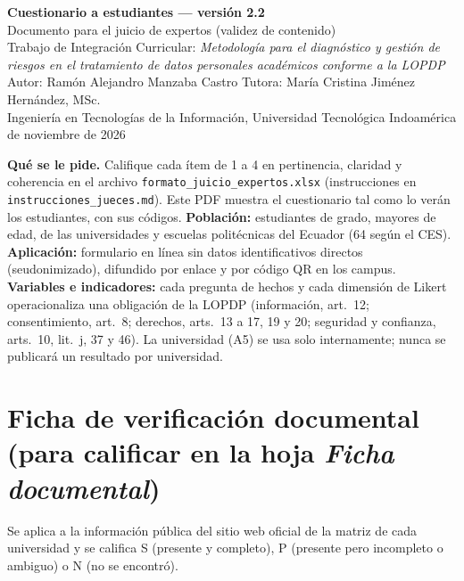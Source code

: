 \documentclass[11pt,a4paper]{article}
\begin{document}
\begin{center}
{\large\textbf{Cuestionario a estudiantes --- versión 2.2}}\\[2pt]
Documento para el juicio de expertos (validez de contenido)\\[2pt]
\small Trabajo de Integración Curricular: \textit{Metodología para el diagnóstico y gestión de riesgos en el tratamiento de datos personales académicos conforme a la LOPDP}\\
Autor: Ramón Alejandro Manzaba Castro \quad Tutora: María Cristina Jiménez Hernández, MSc.\\
Ingeniería en Tecnologías de la Información, Universidad Tecnológica Indoamérica  de noviembre de 2026
\end{center}

\textbf{Qué se le pide.} Califique cada ítem de 1 a 4 en pertinencia, claridad y coherencia en el archivo \texttt{formato\_juicio\_expertos.xlsx} (instrucciones en \texttt{instrucciones\_jueces.md}). Este PDF muestra el cuestionario tal como lo verán los estudiantes, con sus códigos. \textbf{Población:} estudiantes de grado, mayores de edad, de las universidades y escuelas politécnicas del Ecuador (64 según el CES). \textbf{Aplicación:} formulario en línea sin datos identificativos directos (seudonimizado), difundido por enlace y por código QR en los campus. \textbf{Variables e indicadores:} cada pregunta de hechos y cada dimensión de Likert operacionaliza una obligación de la LOPDP (información, art.~12; consentimiento, art.~8; derechos, arts.~13 a 17, 19 y 20; seguridad y confianza, arts.~10, lit.~j, 37 y 46). La universidad (A5) se usa solo internamente; nunca se publicará un resultado por universidad.



\section*{Ficha de verificación documental (para calificar en la hoja \textit{Ficha documental})}

Se aplica a la información pública del sitio web oficial de la matriz de cada universidad y se califica S (presente y completo), P (presente pero incompleto o ambiguo) o N (no se encontró).
\end{document}
